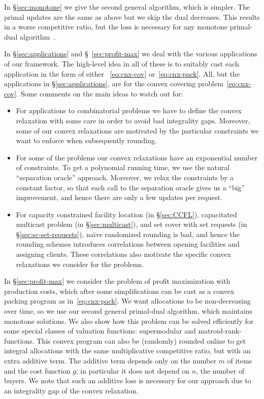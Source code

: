 \documentclass[letterpaper,11pt]{article}
\begin{document}
In \S\ref{sec:monotone} we give the second general algorithm, which is
simpler. The primal updates are the same as above but we skip the dual
decreases. This results in a worse competitive ratio, but the loss is
necessary for any monotone primal-dual
algorithm~\cite{BN-MOR}.

In \S\ref{sec:applications} and \S~\ref{sec:profit-max} we deal with the
various applications of our framework. The high-level idea in all of these
is to suitably cast each application in the form of either ~\eqref{eq:cnx-cov}
or~\eqref{eq:cnx-pack}. All, but the applications in
\S\ref{sec:applications}, are for the convex covering problem~\eqref{eq:cnx-cov}. Some
comments on the main ideas to watch out for:
\begin{itemize}
\item For applications to combinatorial problems we have to define the
  convex relaxation with some care in order to avoid bad integrality
  gaps. Moreover, some of our convex relaxations are motivated by the
  particular constraints we want to enforce when
  subsequently rounding.

\item For some of the problems our convex relaxations have an
  exponential number of constraints. To get a polynomial running time,
  we use the natural ``separation oracle'' approach. Moreover, we relax
  the constraints by a constant factor, so that each call to the
  separation oracle gives us a ``big'' improvement, and hence there are
  only a few updates per request.

\item For capacity constrained facility location (in \S\ref{sec:CCFL}),
  capacitated multicast problem (in \S\ref{sec:multicast}), and set
  cover with set requests (in \S\ref{sec:sc-set-requests}), na\"{\i}ve
  randomized rounding is bad, and hence the rounding schemes introduces
  correlations between opening facilities and assigning clients. These
  correlations also motivate the specific convex relaxations we consider
  for the problems.
\end{itemize}


In \S\ref{sec:profit-max} we consider the problem of profit maximization
with production costs, which after some simplifications can be cast as a
convex packing program as in~\eqref{eq:cnx-pack}.  We want allocations
to be non-decreasing over time, so we use our second general primal-dual
algorithm, which maintains monotone solutions. We also show how this
problem can be solved efficiently for some special classes of valuation
functions: supermodular and matroid-rank-functions. This convex program
can also be (randomly) rounded online to get integral allocations with the
same multiplicative competitive ratio, but with an extra additive term. The
additive term depends only on the number $m$ of items and the cost
function $g$; in particular it does not depend on $n$, the number of
buyers. We note that such an additive loss is necessary for our approach
due to an integrality gap of the convex relaxation.
\end{document}

